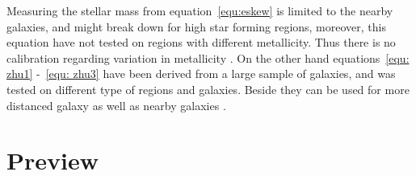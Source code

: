 Measuring the stellar mass from equation~\ref{equ:eskew} is limited to the nearby galaxies, and might break down for high star forming regions, moreover, this equation have not tested on regions with different metallicity. Thus there is no calibration regarding variation in  metallicity \citep{Eskew12}. On the other hand equations~\ref{equ: zhu1} -~\ref{equ: zhu3} have been derived from a large sample of galaxies, and was tested on different type of regions and galaxies. Beside they can be used for more distanced galaxy as well as nearby galaxies \citep{Zhu10}. 

\section{Preview}
\label{sec: pre_intro}


 
